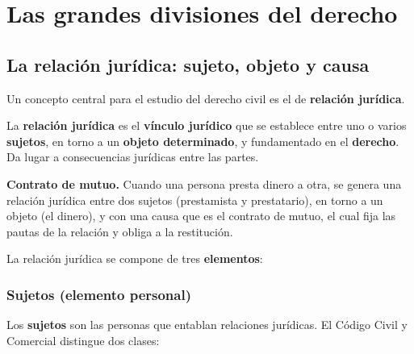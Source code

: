 \documentclass[12pt, a4paper]{report}
\begin{document}
\chapter{Las grandes divisiones del derecho}

\section{La relación jurídica: sujeto, objeto y causa}

Un concepto central para el estudio del derecho civil es el de
\textbf{relación jurídica}.

\begin{definition}
La \textbf{relación jurídica} es el \textbf{vínculo jurídico} que se establece
entre uno o varios \textbf{sujetos}, en torno a un \textbf{objeto determinado},
y fundamentado en el \textbf{derecho}. Da lugar a consecuencias jurídicas entre
las partes.
\end{definition}

\begin{example}
\textbf{Contrato de mutuo.} Cuando una persona presta dinero a otra, se genera
una relación jurídica entre dos sujetos (prestamista y prestatario), en torno a
un objeto (el dinero), y con una causa que es el contrato de mutuo, el cual fija
las pautas de la relación y obliga a la restitución.
\end{example}

La relación jurídica se compone de tres \textbf{elementos}:

\subsection{Sujetos (elemento personal)}

Los \textbf{sujetos} son las personas que entablan relaciones jurídicas. El
Código Civil y Comercial distingue dos clases:
\end{document}
